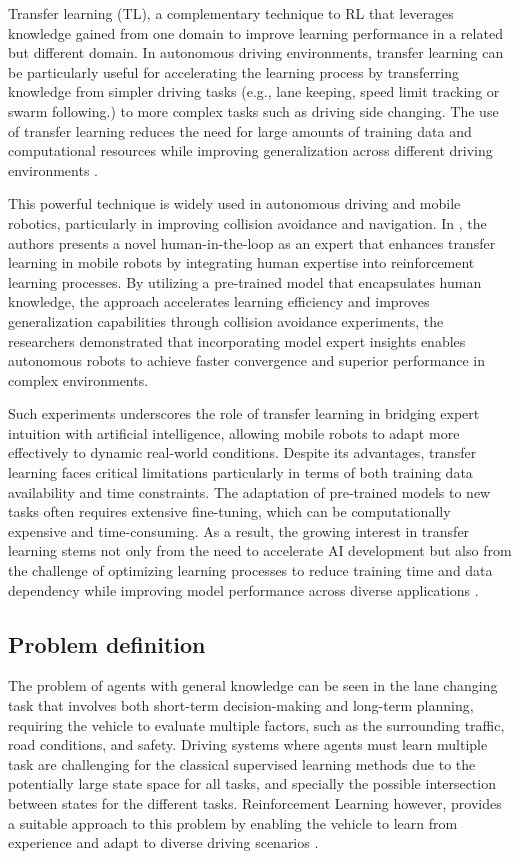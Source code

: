 Transfer learning (TL), a complementary technique to RL that leverages knowledge gained from one domain to improve learning performance in a related but different domain. In autonomous driving environments, transfer learning can be particularly useful for accelerating the learning process by transferring knowledge from simpler driving tasks (e.g., lane keeping, speed limit tracking or swarm following.) to more complex tasks such as driving side changing. The use of transfer learning reduces the need for large amounts of training data and computational resources while improving generalization across different driving environments \cite{TL_survey}.

This powerful technique is widely used in autonomous driving and mobile robotics, particularly in improving collision avoidance and navigation. In \cite{collision_avoidance_tl}, the authors presents a novel human-in-the-loop  as an expert that enhances transfer learning in mobile robots by integrating human expertise into reinforcement learning processes. By utilizing a pre-trained model that encapsulates human knowledge, the approach accelerates learning efficiency and improves generalization capabilities through collision avoidance experiments, the researchers demonstrated that incorporating model expert insights enables autonomous robots to achieve faster convergence and superior performance in complex environments.

Such experiments underscores the role of transfer learning in bridging expert intuition with artificial intelligence, allowing mobile robots to adapt more effectively to dynamic real-world conditions. Despite its advantages, transfer learning faces critical limitations particularly in terms of both training data availability and time constraints. The adaptation of pre-trained models to new tasks often requires extensive fine-tuning, which can be computationally expensive and time-consuming. As a result, the growing interest in transfer learning stems not only from the need to accelerate AI development but also from the challenge of optimizing learning processes to reduce training time and data dependency while improving model performance across diverse applications \cite{tl_survey_2019}. 

\subsection{Problem definition}
\label{sec:problem_definition}
The problem of agents with general knowledge can be seen in the lane changing task that involves both short-term decision-making and long-term planning, requiring the vehicle to evaluate multiple factors, such as the surrounding traffic, road conditions, and safety. Driving systems where agents must learn multiple task are challenging for the classical supervised learning methods due to the potentially large state space for all tasks, and specially the possible intersection between states for the different tasks. Reinforcement Learning however, provides a suitable approach to this problem by enabling the vehicle to learn from experience and adapt to diverse driving scenarios \cite{dpr_for_real_driving_systems}.

